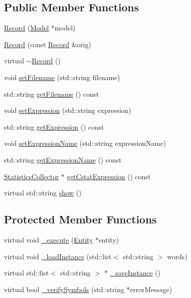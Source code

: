 \subsection*{Public Member Functions}
\begin{DoxyCompactItemize}
\item 
\hyperlink{class_record_a2772f19656d25d57e5329ab49fd915f3}{Record} (\hyperlink{class_model}{Model} $\ast$model)
\item 
\hyperlink{class_record_ac099b82f45a0f9e8aaa6fa6f16869cff}{Record} (const \hyperlink{class_record}{Record} \&orig)
\item 
virtual \hyperlink{class_record_ad2ce1a99d866834ab53dedd788cb1ea6}{$\sim$\+Record} ()
\item 
void \hyperlink{class_record_ad46e1a0eb5307fffc9526181c482e5cd}{set\+Filename} (std\+::string filename)
\item 
std\+::string \hyperlink{class_record_ad70272434456129d956a958ed418b099}{get\+Filename} () const 
\item 
void \hyperlink{class_record_a9006daa06949cd3003ccfcada5ab2d4f}{set\+Expression} (std\+::string expression)
\item 
std\+::string \hyperlink{class_record_afb9f8a862049827c67a5b185fa3d59d2}{get\+Expression} () const 
\item 
void \hyperlink{class_record_ad37b762ac0542b78363865fe9864f606}{set\+Expression\+Name} (std\+::string expression\+Name)
\item 
std\+::string \hyperlink{class_record_a1d8d578ca9638ae4dd5d5ea02e8ff24a}{get\+Expression\+Name} () const 
\item 
\hyperlink{class_statistics_collector}{Statistics\+Collector} $\ast$ \hyperlink{class_record_a46bca14163c5797b13d0cf8bc7744db9}{get\+Cstat\+Expression} () const 
\item 
virtual std\+::string \hyperlink{class_record_aa2e77e0277c38e76541ec5811e0379ab}{show} ()
\end{DoxyCompactItemize}
\subsection*{Protected Member Functions}
\begin{DoxyCompactItemize}
\item 
virtual void \hyperlink{class_record_a036df9e81131cf36de20079c95d55151}{\+\_\+execute} (\hyperlink{class_entity}{Entity} $\ast$entity)
\item 
virtual void \hyperlink{class_record_a52a241ee0eec300483d593b2cc7febe5}{\+\_\+load\+Instance} (std\+::list$<$ std\+::string $>$ words)
\item 
virtual std\+::list$<$ std\+::string $>$ $\ast$ \hyperlink{class_record_ad4eaa67bbfecbfad8b3b93e010f46f78}{\+\_\+save\+Instance} ()
\item 
virtual bool \hyperlink{class_record_abbe2e7afdd925552e71a0c081e97120f}{\+\_\+verify\+Symbols} (std\+::string $\ast$error\+Message)
\end{DoxyCompactItemize}
